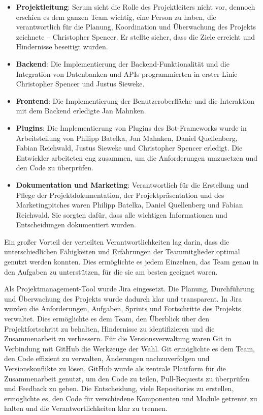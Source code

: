 \begin{itemize}
    \item \textbf{Projektleitung}: Scrum sieht die Rolle des Projektleiters nicht vor, dennoch erschien es dem ganzen Team wichtig, eine Person zu haben, die verantwortlich für die Planung, Koordination und Überwachung des Projekts zeichnete – Christopher Spencer. Er stellte sicher, dass die Ziele erreicht und Hindernisse beseitigt wurden.
    \item \textbf{Backend}: Die Implementierung der Backend-Funktionalität und die Integration von Datenbanken und APIs programmierten in erster Linie Christopher Spencer und Justus Sieweke.
    \item \textbf{Frontend}: Die Implementierung der Benutzeroberfläche und die Interaktion mit dem Backend erledigte Jan Mahnken.
    \item \textbf{Plugins}: Die Implementierung von Plugins des Bot-Frameworks wurde in Arbeitsteilung von Philipp Batelka, Jan Mahnken, Daniel Quellenberg, Fabian Reichwald, Justus Sieweke und Christopher Spencer erledigt. Die Entwickler arbeiteten eng zusammen, um die Anforderungen umzusetzen und den Code zu überprüfen.
    \item \textbf{Dokumentation und Marketing}: Verantwortlich für die Erstellung und Pflege der Projektdokumentation, der Projektpräsentation und des Marketingpitches waren Philipp Batelka, Daniel Quellenberg und Fabian Reichwald. Sie sorgten dafür, dass alle wichtigen Informationen und Entscheidungen dokumentiert wurden.
\end{itemize}

Ein großer Vorteil der verteilten Verantwortlichkeiten lag darin, dass die unterschiedlichen Fähigkeiten und Erfahrungen der Teammitglieder optimal genutzt werden konnten. Dies ermöglichte es jedem Einzelnen, das Team genau in den Aufgaben zu unterstützen, für die sie am besten geeignet waren.

Als Projektmanagement-Tool wurde \gls{Jira} eingesetzt. Die Planung, Durchführung und Überwachung des Projekts wurde dadurch klar und transparent. In Jira wurden die Anforderungen, Aufgaben, Sprints und Fortschritte des Projekts verwaltet. Dies ermöglichte es dem Team, den Überblick über den Projektfortschritt zu behalten, Hindernisse zu identifizieren und die Zusammenarbeit zu verbessern. Für die Versionsverwaltung waren \gls{Git} in Verbindung mit \gls{GitHub} die Werkzeuge der Wahl. Git ermöglichte es dem Team, den Code effizient zu verwalten, Änderungen nachzuverfolgen und Versionskonflikte zu lösen. GitHub wurde als zentrale Plattform für die Zusammenarbeit genutzt, um den Code zu teilen, \gls{Pull-Requests} zu überprüfen und Feedback zu geben. Die Entscheidung, viele Repositories zu erstellen, ermöglichte es, den Code für verschiedene Komponenten und Module getrennt zu halten und die Verantwortlichkeiten klar zu trennen.


